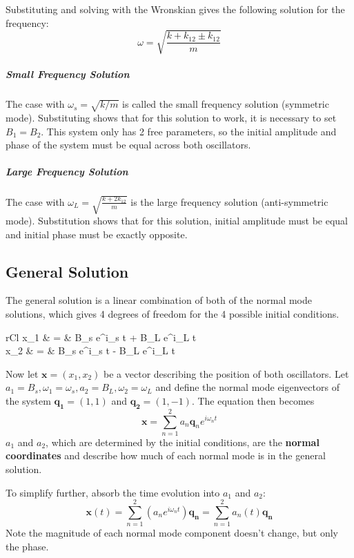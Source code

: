 \documentclass[11pt]{article}
\begin{document}
Substituting and solving with the Wronskian gives the following solution for the frequency:
\begin{equation}
	\omega = \sqrt{\frac{k + k_{12} \pm k_{12}}{m}}
\end{equation}

\subparagraph{Small Frequency Solution} The case with $\omega_s = \sqrt{k/m}$ is called the small frequency solution (symmetric mode). Substituting shows that for this solution to work, it is necessary to set $B_1 = B_2$. This system only has 2 free parameters, so the initial amplitude and phase of the system must be equal across both oscillators.

\subparagraph{Large Frequency Solution} The case with $\omega_L = \sqrt{\frac{k + 2k_{12}}{m}}$ is the large frequency solution (anti-symmetric mode). Substitution shows that for this solution, initial amplitude must be equal and initial phase must be exactly opposite.

\subsection{General Solution}
	The general solution is a linear combination of both of the normal mode solutions, which gives 4 degrees of freedom for the 4 possible initial conditions.
	\begin{IEEEeqnarray}{rCl}
		x_1 & = & B_s e^{i\omega_s t} + B_L e^{i\omega_L t}\\
		x_2 & = & B_s e^{i\omega_s t} - B_L e^{i\omega_L t}
	\end{IEEEeqnarray}
	
	Now let $\mathbf{x} = (x_1, x_2)$ be a vector describing the position of both oscillators. Let $a_1 = B_s, \omega_1 = \omega_s, a_2 = B_L, \omega_2 = \omega_L$ and define the normal mode eigenvectors of the system $\mathbf{q_1} = (1,1)$ and $\mathbf{q_2} = (1,-1)$. The equation then becomes
	\begin{equation}
		\mathbf{x} = \sum_{n=1}^2 a_n \mathbf{q}_n e^{i\omega_n t}
	\end{equation}
	$a_1$ and $a_2$, which are determined by the initial conditions, are the \textbf{normal coordinates} and describe how much of each normal mode is in the general solution.
	
	To simplify further, absorb the time evolution into $a_1$ and $a_2$:
	\begin{equation}
		\mathbf{x}(t) = \sum_{n=1}^2 (a_n e^{i\omega_n t})\mathbf{q_n} = \sum_{n=1}^2 a_n(t)\mathbf{q_n}
	\end{equation}
	Note the magnitude of each normal mode component doesn't change, but only the phase. 
	
\end{document}
